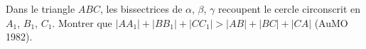 Dans le triangle $ABC$, les bissectrices de $\alpha$, $\beta$, $\gamma$ recoupent le cercle circonscrit en $A_1$, $B_1$, $C_1$. Montrer que $|AA_1| + |BB_1| + |CC_1| > |AB| + |BC| + |CA|$ (AuMO 1982).
